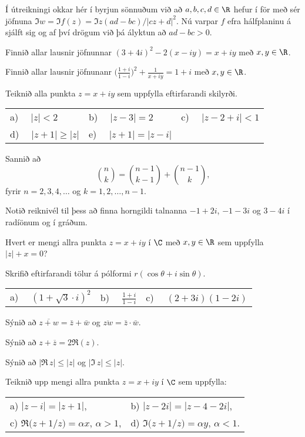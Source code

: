Í útreikningi okkar hér í byrjun sönnuðum  við að
$a,b,c,d\in \R$ hefur í för með sér jöfnuna
$\Im w = \Im f(z)=\Im z(ad-bc)/|cz+d|^2$. Nú varpar 
$f$ efra hálfplaninu  á sjálft sig og af því drögum við 
þá ályktun að  $ad-bc>0$.



\vfill\eject

\aefing

\daemi Finnið allar lausnir jöfnunnar $(3+4i)^2 - 2(x-iy) = x+iy$
með $x,y\in \R$.

\daemi Finnið allar lausnir jöfnunanr 
$\big(\frac{1+i}{1-i}\big)^2 + \frac{1}{x+iy} = 1+i$
með $x,y\in \R$.

\daemi Teiknið alla punkta $z=x+iy$ sem uppfylla eftirfarandi skilyrði.


\begin{tabular}{lll}
a) \ \  $|z|<2$ & b) \ \ $|z-3|=2$ &c) \ \  $|z-2+i|<1$ \\
d) \ \  $|z+1|\geq |z|$ & e) \ \  $|z+1| = |z-i|$
\end{tabular}

\daemi Sannið að 
$$
\binom nk=\binom{n-1}{k-1}+\binom{n-1}k, 
$$
fyrir $n=2,3,4,\dots$ og $k=1,2,\dots,n-1$.


\daemi Notið reiknivél til þess að finna horngildi talnanna
$-1+2i$, $-1-3i$ og  $3-4i$ í radíönum og í gráðum.

\daemi Hvert er mengi allra punkta $z=x+iy$ í $\C$ með $x,y\in \R$
sem uppfylla $|z|+x=0$?


\daemi Skrifið eftirfarandi tölur á pólformi $r(\cos \theta+i\sin
\theta)$. 

\smallskip
\begin{tabular}{lll}
a) \ \  $(1+\sqrt{3}\cdot i)^2$ &
b) \ \  $\frac{1+i}{1-i}$ &
c) \ \ $(2+3i)(1-2i)$ \\
\end{tabular}

\daemi Sýnið að $\overline {z+w}=\bar z+\bar w$ og
$\overline{zw}=\bar z\cdot \bar w$.

\daemi Sýnið að $z + \overline z = 2\Re(z)$.

\daemi Sýnið að $|\Re\, z|\leq|z|$ og $|\Im\, z|\leq|z|$.

\daemi Teiknið upp mengi allra punkta $z=x+iy$ í $\C$ sem uppfylla:

\smallskip
\begin{tabular}{ll}
a)  $|z-i|=|z+1|$,
&b) $|z-2i|=|z-4-2i|$,\\
c) $\Re\big(z+1/z\big)={\alpha}x$, ${\alpha}>1$,
&d) $\Im\big(z+1/z\big)={\alpha} y$, ${\alpha}<1$.\\ 
\end{tabular}

